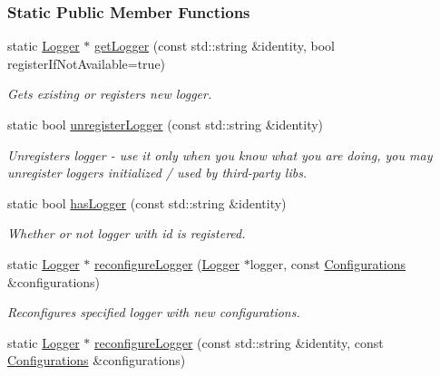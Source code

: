 \subsubsection*{Static Public Member Functions}
\begin{DoxyCompactItemize}
\item 
\hypertarget{a00049_aaebf868c558e3ba1d2e4f073a00f1d4a}{}static \hyperlink{a00048}{Logger} $\ast$ \hyperlink{a00049_aaebf868c558e3ba1d2e4f073a00f1d4a}{get\+Logger} (const std\+::string \&identity, bool register\+If\+Not\+Available=true)\label{a00049_aaebf868c558e3ba1d2e4f073a00f1d4a}

\begin{DoxyCompactList}\small\item\em Gets existing or registers new logger. \end{DoxyCompactList}\item 
\hypertarget{a00049_a201d261ea57c070f07f0bf2006158587}{}static bool \hyperlink{a00049_a201d261ea57c070f07f0bf2006158587}{unregister\+Logger} (const std\+::string \&identity)\label{a00049_a201d261ea57c070f07f0bf2006158587}

\begin{DoxyCompactList}\small\item\em Unregisters logger -\/ use it only when you know what you are doing, you may unregister loggers initialized / used by third-\/party libs. \end{DoxyCompactList}\item 
\hypertarget{a00049_a2d7a056cb7d9da3d96c709a2fac5c2bb}{}static bool \hyperlink{a00049_a2d7a056cb7d9da3d96c709a2fac5c2bb}{has\+Logger} (const std\+::string \&identity)\label{a00049_a2d7a056cb7d9da3d96c709a2fac5c2bb}

\begin{DoxyCompactList}\small\item\em Whether or not logger with id is registered. \end{DoxyCompactList}\item 
\hypertarget{a00049_a888aca5bdccccc322da2eed430909d04}{}static \hyperlink{a00048}{Logger} $\ast$ \hyperlink{a00049_a888aca5bdccccc322da2eed430909d04}{reconfigure\+Logger} (\hyperlink{a00048}{Logger} $\ast$logger, const \hyperlink{a00014}{Configurations} \&configurations)\label{a00049_a888aca5bdccccc322da2eed430909d04}

\begin{DoxyCompactList}\small\item\em Reconfigures specified logger with new configurations. \end{DoxyCompactList}\item 
\hypertarget{a00049_a105f776fe19cb7fa2fccd2993d9f7a7c}{}static \hyperlink{a00048}{Logger} $\ast$ \hyperlink{a00049_a105f776fe19cb7fa2fccd2993d9f7a7c}{reconfigure\+Logger} (const std\+::string \&identity, const \hyperlink{a00014}{Configurations} \&configurations)\label{a00049_a105f776fe19cb7fa2fccd2993d9f7a7c}


\end{DoxyCompactItemize}
